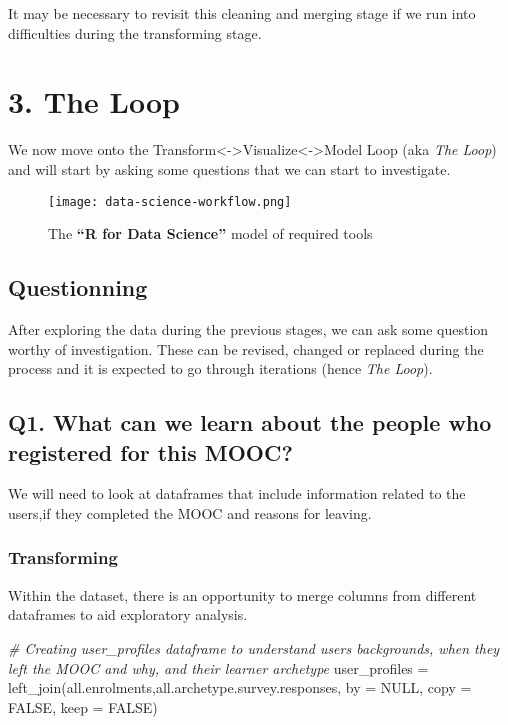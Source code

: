 \documentclass[
]{article}
\newenvironment{Shaded}{\begin{snugshade}}{\end{snugshade}}
\newcommand{\AttributeTok}[1]{\textcolor[rgb]{0.77,0.63,0.00}{#1}}
\newcommand{\CommentTok}[1]{\textcolor[rgb]{0.56,0.35,0.01}{\textit{#1}}}
\newcommand{\ConstantTok}[1]{\textcolor[rgb]{0.00,0.00,0.00}{#1}}
\newcommand{\FunctionTok}[1]{\textcolor[rgb]{0.00,0.00,0.00}{#1}}
\newcommand{\NormalTok}[1]{#1}
\newcommand{\OtherTok}[1]{\textcolor[rgb]{0.56,0.35,0.01}{#1}}
\begin{document}
It may be necessary to revisit this cleaning and merging stage if we run
into difficulties during the transforming stage.

\newpage

\hypertarget{the-loop}{%
\section{3. The Loop}\label{the-loop}}

We now move onto the
Transform\textless-\textgreater Visualize\textless-\textgreater Model
Loop (aka \emph{The Loop}) and will start by asking some questions that
we can start to investigate.

\begin{figure}
\centering
\texttt{[image: data-science-workflow.png]}
\caption{The \textbf{``R for Data Science''} model of required tools}
\end{figure}

\hypertarget{questionning}{%
\subsection{Questionning}\label{questionning}}

After exploring the data during the previous stages, we can ask some
question worthy of investigation. These can be revised, changed or
replaced during the process and it is expected to go through iterations
(hence \emph{The Loop}).

\hypertarget{q1.-what-can-we-learn-about-the-people-who-registered-for-this-mooc}{%
\subsection{Q1. What can we learn about the people who registered for
this
MOOC?}\label{q1.-what-can-we-learn-about-the-people-who-registered-for-this-mooc}}

We will need to look at dataframes that include information related to
the users,if they completed the MOOC and reasons for leaving.

\hypertarget{transforming}{%
\subsubsection{Transforming}\label{transforming}}

Within the dataset, there is an opportunity to merge columns from
different dataframes to aid exploratory analysis.

\begin{Shaded}
\begin{Highlighting}[]
\CommentTok{\# Creating user\_profiles dataframe to understand users\textquotesingle{} backgrounds, when they left the MOOC and why, and their learner archetype}
\NormalTok{user\_profiles }\OtherTok{=} \FunctionTok{left\_join}\NormalTok{(all.enrolments,all.archetype.survey.responses, }\AttributeTok{by =} \ConstantTok{NULL}\NormalTok{, }\AttributeTok{copy =} \ConstantTok{FALSE}\NormalTok{, }\AttributeTok{keep =} \ConstantTok{FALSE}\NormalTok{)}
\end{Highlighting}
\end{Shaded}
\end{document}
